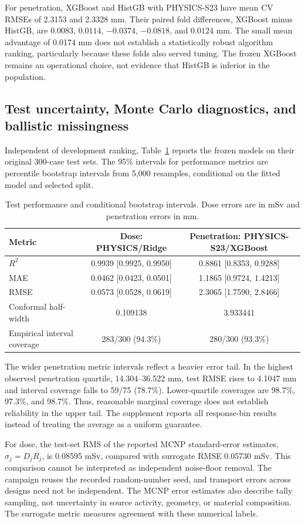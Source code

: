 For penetration, XGBoost and HistGB with PHYSICS-S23 have mean CV RMSEs of 2.3153 and 2.3328 mm. Their paired fold differences, XGBoost minus HistGB, are $0.0083$, $0.0114$, $-0.0374$, $-0.0818$, and $0.0124$ mm. The small mean advantage of 0.0174 mm does not establish a statistically robust algorithm ranking, particularly because these folds also served tuning. The frozen XGBoost remains an operational choice, not evidence that HistGB is inferior in the population.

\subsection{Test uncertainty, Monte Carlo diagnostics, and ballistic missingness}
Independent of development ranking, Table~\ref{tab:test} reports the frozen models on their original 300-case test sets. The 95\% intervals for performance metrics are percentile bootstrap intervals from 5,000 resamples, conditional on the fitted model and selected split.
\begin{table}[htbp]\centering\small
\caption{Test performance and conditional bootstrap intervals. Dose errors are in mSv and penetration errors in mm.}\label{tab:test}
\begin{tabular}{@{}lcc@{}}\toprule
Metric & Dose: PHYSICS/Ridge & Penetration: PHYSICS-S23/XGBoost\\\midrule
$R^2$ &0.9939 [0.9925, 0.9950]&0.8861 [0.8353, 0.9288]\\
MAE &0.0462 [0.0423, 0.0501]&1.1865 [0.9724, 1.4213]\\
RMSE &0.0573 [0.0528, 0.0619]&2.3065 [1.7590, 2.8466]\\
Conformal half-width &0.109138&3.933441\\
Empirical interval coverage &283/300 (94.3\%)&280/300 (93.3\%)\\\bottomrule
\end{tabular}\end{table}
The wider penetration metric intervals reflect a heavier error tail. In the highest observed penetration quartile, 14.304--36.522 mm, test RMSE rises to 4.1047 mm and interval coverage falls to 59/75 (78.7\%). Lower-quartile coverages are 98.7\%, 97.3\%, and 98.7\%. Thus, reasonable marginal coverage does not establish reliability in the upper tail. The supplement reports all response-bin results instead of treating the average as a uniform guarantee.

For dose, the test-set RMS of the reported MCNP standard-error estimates, $\sigma_j=D_jR_j$, is 0.08595 mSv, compared with surrogate RMSE 0.05730 mSv. This comparison cannot be interpreted as independent noise-floor removal. The campaign reuses the recorded random-number seed, and transport errors across designs need not be independent. The MCNP error estimates also describe tally sampling, not uncertainty in source activity, geometry, or material composition. The surrogate metric measures agreement with these numerical labels.

